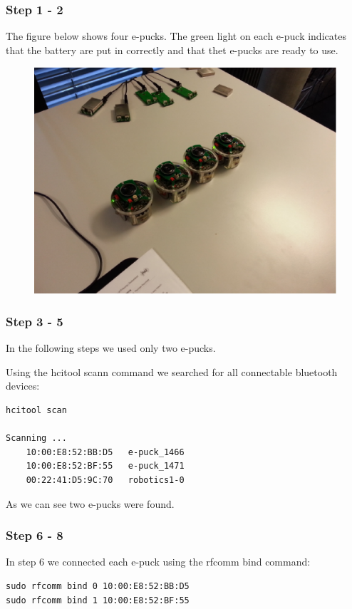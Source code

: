 \documentclass[12pt]{article}
\begin{document}
\subsubsection*{Step 1 - 2}
The figure below shows four e-pucks. The green light on each e-puck indicates that the battery are put in correctly and that thet e-pucks are ready to use.
\begin{figure}[!htb]
\centering
\includegraphics[scale=0.5]{pics/epucks_1.eps} 
\end{figure}

\subsubsection*{Step 3 - 5}
In the following steps we used only two e-pucks.

Using the hcitool scann command we searched for all connectable bluetooth devices:
\begin{lstlisting}
hcitool scan

Scanning ...
	10:00:E8:52:BB:D5	e-puck_1466
	10:00:E8:52:BF:55	e-puck_1471
	00:22:41:D5:9C:70	robotics1-0
\end{lstlisting}

As we can see two e-pucks were found.

\subsubsection*{Step 6 - 8}
In step 6 we connected each e-puck using the rfcomm bind command:
\begin{lstlisting}
sudo rfcomm bind 0 10:00:E8:52:BB:D5
sudo rfcomm bind 1 10:00:E8:52:BF:55
\end{lstlisting}
\end{document}
